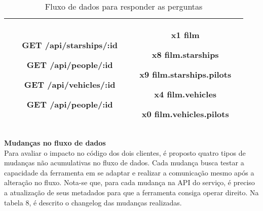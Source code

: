 \begin{table}[H]
\begin{tabular}{|c|c|c|}
\begin{minipage}[t]{0.3\textwidth}
\begin{itemize}
        \item[\textbf{GET}] /api/starships/:id
        \item[\textbf{GET}] /api/people/:id
        \item[\textbf{GET}] /api/vehicles/:id
        \item[\textbf{GET}] /api/people/:id
      \end{itemize}
    \end{minipage} & \begin{minipage}[t]{0.5\textwidth}
      \begin{itemize}
        \item[\textbf{x1}] film
        \item[\textbf{x8}] film.starships
        \item[\textbf{x9}] film.starships.pilots
        \item[\textbf{x4}] film.vehicles
        \item[\textbf{x0}] film.vehicles.pilots
      \end{itemize}
    \end{minipage} \\
    \hline
  \end{tabular}
  \caption{Fluxo de dados para responder as perguntas}
\end{table}

\textbf{Mudanças no fluxo de dados} \\

Para avaliar o impacto no código dos dois clientes, é proposto quatro tipos de mudanças não acumulativas no fluxo de dados. Cada mudança busca testar a capacidade da ferramenta em se adaptar e realizar a comunicação mesmo após a alteração no fluxo. Nota-se que, para cada mudança na API do serviço, é preciso a atualização de seus metadados para que a ferramenta consiga operar direito. Na tabela 8, é descrito o changelog das mudanças realizadas.

